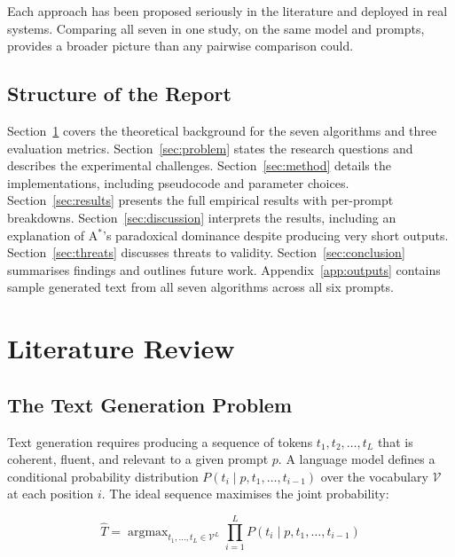 \documentclass[12pt]{article}
\begin{document}
	Each approach has been proposed seriously in the literature and deployed in real systems. Comparing all seven in one study, on the same model and prompts, provides a broader picture than any pairwise comparison could.
	
	\subsection{Structure of the Report}
	
	Section~\ref{sec:litreview} covers the theoretical background for the seven algorithms and three evaluation metrics. Section~\ref{sec:problem} states the research questions and describes the experimental challenges. Section~\ref{sec:method} details the implementations, including pseudocode and parameter choices. Section~\ref{sec:results} presents the full empirical results with per-prompt breakdowns. Section~\ref{sec:discussion} interprets the results, including an explanation of A$^*$'s paradoxical dominance despite producing very short outputs. Section~\ref{sec:threats} discusses threats to validity. Section~\ref{sec:conclusion} summarises findings and outlines future work. Appendix~\ref{app:outputs} contains sample generated text from all seven algorithms across all six prompts.
	
	\section{Literature Review}
	\label{sec:litreview}
	
	\subsection{The Text Generation Problem}
	
	Text generation requires producing a sequence of tokens $t_1, t_2, \ldots, t_L$ that is coherent, fluent, and relevant to a given prompt $p$. A language model defines a conditional probability distribution $P(t_i \mid p, t_1, \ldots, t_{i-1})$ over the vocabulary $\mathcal{V}$ at each position $i$. The ideal sequence maximises the joint probability:
	
	\begin{equation}
		\hat{T} = \operatorname{argmax}_{t_1,\ldots,t_L \in \mathcal{V}^L}
		\prod_{i=1}^{L} P(t_i \mid p, t_1, \ldots, t_{i-1})
		\label{eq:argmax}
	\end{equation}
	
\end{document}
